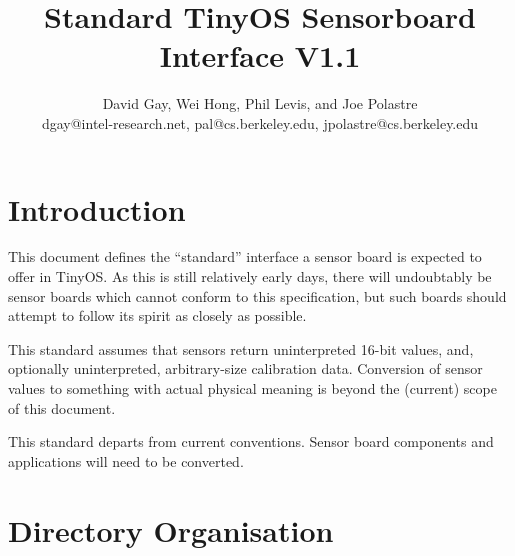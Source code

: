 \documentclass{article}
\title{Standard TinyOS Sensorboard Interface V1.1}
\author{David Gay, Wei Hong, Phil Levis, and Joe Polastre \\
dgay@intel-research.net, pal@cs.berkeley.edu, jpolastre@cs.berkeley.edu}
\begin{document}
\maketitle

\section{Introduction}

This document defines the ``standard'' interface a sensor board is expected
to offer in TinyOS. As this is still relatively early days, there will
undoubtably be sensor boards which cannot conform to this specification,
but such boards should attempt to follow its spirit as closely as possible.

This standard assumes that sensors return uninterpreted 16-bit values, and,
optionally uninterpreted, arbitrary-size calibration data. Conversion of
sensor values to something with actual physical meaning is beyond the
(current) scope of this document.

This standard departs from current conventions. Sensor board components
and applications will need to be converted.

\section{Directory Organisation}
\end{document}
